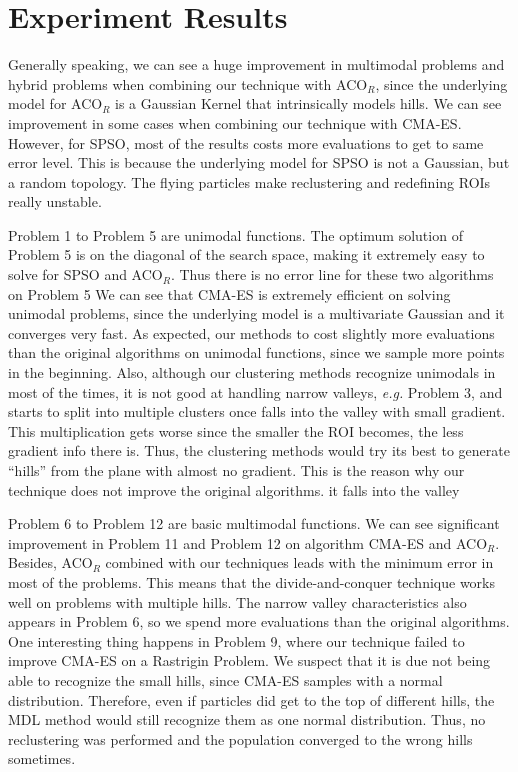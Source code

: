 
\section{Experiment Results}

Generally speaking, we can see a huge improvement in multimodal problems and hybrid problems
when combining our technique with ACO$_R$,
since the underlying model for ACO$_R$ is a Gaussian Kernel that intrinsically models hills.
We can see improvement in some cases when combining our technique with CMA-ES.
However, for SPSO, most of the results costs more evaluations to get to same error level.
This is because the underlying model for SPSO is not a Gaussian, but a random topology.
The flying particles make reclustering and redefining ROIs really unstable.


Problem 1 to Problem 5 are unimodal functions.
The optimum solution of Problem 5 is on the diagonal of the search space, 
making it extremely easy to solve for SPSO and ACO$_R$.
Thus there is no error line for these two algorithms on Problem 5
We can see that CMA-ES is extremely efficient on solving unimodal problems, 
since the underlying model is a multivariate Gaussian and it converges very fast.
As expected, our methods to cost slightly more evaluations than the original algorithms on unimodal functions,
since we sample more points in the beginning. 
Also, although our clustering methods recognize unimodals in most of the times,
it is not good at handling narrow valleys, \textit{e.g.} Problem 3, 
and starts to split into multiple clusters once falls into the valley with small gradient.
This multiplication gets worse since the smaller the ROI becomes, the less gradient info there is.
Thus, the clustering methods would try its best to generate ``hills'' from the plane with almost no gradient.
This is the reason why our technique does not improve the original algorithms.
it falls into the valley


Problem 6 to Problem 12 are basic multimodal functions.
We can see significant improvement in Problem 11 and Problem 12 on algorithm CMA-ES and ACO$_R$.
Besides, ACO$_R$ combined with our techniques leads with the minimum error in most of the problems.
This means that the divide-and-conquer technique works well on problems with multiple hills.
The narrow valley characteristics also appears in Problem 6, so we spend more evaluations than the original algorithms.
One interesting thing happens in Problem 9, where our technique failed to improve CMA-ES on a Rastrigin Problem.
We suspect that it is due not being able to recognize the small hills, since CMA-ES samples with a normal distribution.
Therefore, even if particles did get to the top of different hills, the MDL method would still recognize them as one normal distribution.
Thus, no reclustering was performed and the population converged to the wrong hills sometimes.

